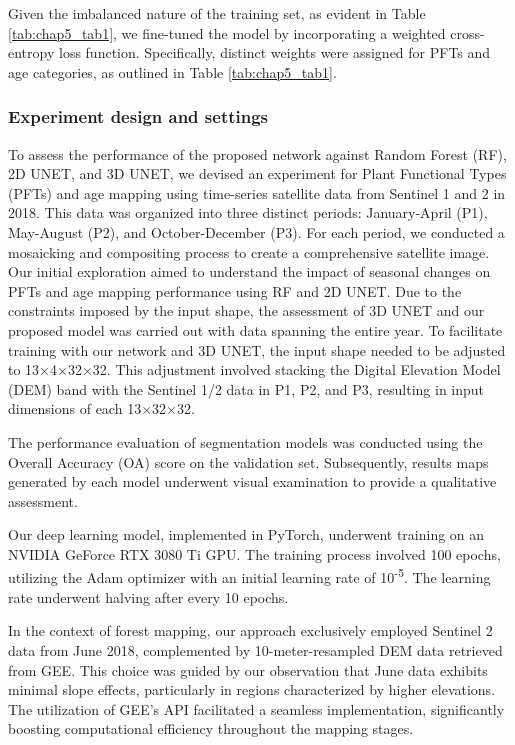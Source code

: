 Given the imbalanced nature of the training set, as evident in Table \ref{tab:chap5_tab1}, we fine-tuned the model by incorporating a weighted cross-entropy loss function. Specifically, distinct weights were assigned for PFTs and age categories, as outlined in Table \ref{tab:chap5_tab1}.

\subsubsection{Experiment design and settings}
To assess the performance of the proposed network against Random Forest (RF), 2D UNET, and 3D UNET, we devised an experiment for Plant Functional Types (PFTs) and age mapping using time-series satellite data from Sentinel 1 and 2 in 2018. This data was organized into three distinct periods: January-April (P1), May-August (P2), and October-December (P3). For each period, we conducted a mosaicking and compositing process to create a comprehensive satellite image. Our initial exploration aimed to understand the impact of seasonal changes on PFTs and age mapping performance using RF and 2D UNET. Due to the constraints imposed by the input shape, the assessment of 3D UNET and our proposed model was carried out with data spanning the entire year. To facilitate training with our network and 3D UNET, the input shape needed to be adjusted to 13$\times$4$\times$32$\times$32. This adjustment involved stacking the Digital Elevation Model (DEM) band with the Sentinel 1/2 data in P1, P2, and P3, resulting in input dimensions of each 13$\times$32$\times$32. \par

The performance evaluation of segmentation models was conducted using the Overall Accuracy (OA) score on the validation set. Subsequently, results maps generated by each model underwent visual examination to provide a qualitative assessment.\par

Our deep learning model, implemented in PyTorch, underwent training on an NVIDIA GeForce RTX 3080 Ti GPU. The training process involved 100 epochs, utilizing the Adam optimizer \citep{kingma2014adam} with an initial learning rate of 10\textsuperscript{-5}. The learning rate underwent halving after every 10 epochs.\par

In the context of forest mapping, our approach exclusively employed Sentinel 2 data from June 2018, complemented by 10-meter-resampled DEM data retrieved from GEE. This choice was guided by our observation that June data exhibits minimal slope effects, particularly in regions characterized by higher elevations. The utilization of GEE's API facilitated a seamless implementation, significantly boosting computational efficiency throughout the mapping stages. \par


